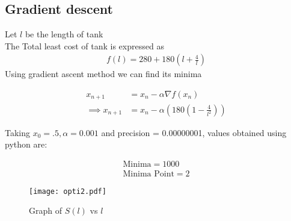 \documentclass[journal,10pt,twocolumn]{article}
\providecommand{\brak}[1]{\ensuremath{\left(#1\right)}}
\begin{document}
\subsection*{\normalsize Gradient descent}
Let $l$ be the length of tank \\ \vspace{1mm}
The Total least cost of tank is expressed as
\begin{align}
	\label{eq:vol_varx}
	f(l) = 280 + 180\brak{l+\frac{4}{l}}
\end{align}
Using gradient ascent method we can find its minima\\ \vspace{2mm}

    \begin{align}
        x_{n+1} &= x_n - \alpha \nabla f(x_n) \\
        \implies x_{n+1} &= x_n - \alpha \brak{180\brak{1-\frac{4}{l^2}}}
    \end{align}
    
Taking $x_0=.5,\alpha=0.001$ and precision = 0.00000001, values obtained using python are:
    
    \begin{align}
        \boxed{\text{Minima} = 1000}\\
        \boxed{\text{Minima Point} = 2}
    \end{align}

\begin{figure}[t]
	\centering
	\texttt{[image: opti2.pdf]}
	\caption{Graph of $S(l)$ vs $l$}
	\label{fig:graph_fx}
\end{figure}
\end{document}
